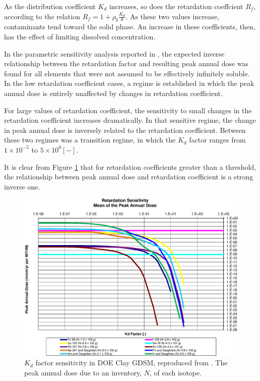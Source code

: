 

As the distribution coefficient $K_d$ increases, so does the retardation 
coeffcient $R_f$, according to the relation $R_f = 1+ \rho_b\frac{K_d}{\theta}$. As these two values increase, contaminants tend 
toward the solid phase. An increase in these coefficients, then, has the effect 
of limiting dissolved concentration.

In the parametric sensitivity analysis reported in \cite{huff_key_2012},
the expected inverse relationship between the retardation factor and resulting
peak annual dose was found for all elements that were not assumed to be
effectively infinitely soluble.  In the low retardation coefficient cases, a
regime is established in which the peak annual dose is entirely unaffected by
changes in retardation coefficient.

For large values of retardation coefficient, the sensitivity to small changes
in the retardation coefficient increases dramatically. In that sensitive
regime, the change in peak annual dose is inversely related to the retardation
coefficient. Between these two regimes was a transition regime, in which the
$K_d$ factor ranges from $1\times10^{-5}$ to $5\times10^{0} [-]$.

It is clear from Figure \ref{fig:KdSumFactor} that
for retardation coefficients greater than a threshold, the
relationship between peak annual dose and retardation coefficient is a strong
inverse one.

\begin{figure}[ht]
\centering
\includegraphics[width=0.7\linewidth]{./results/images/Retardation_Summary_kdFactor.eps}
\caption[$K_d$ factor sensitivity in Clay GDSM]{$K_d$ factor sensitivity in 
        DOE Clay GDSM, reproduced from \cite{huff_key_2012}.
The peak annual dose due to an inventory,
$N$, of each isotope.}
\label{fig:KdSumFactor}
\end{figure}

\FloatBarrier
